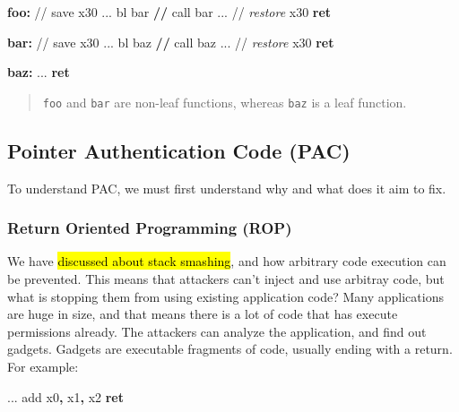 \documentclass[a4paper, nobind]{templates/ociamthesis}
\newenvironment{Shaded}{\begin{snugshade}}{\end{snugshade}}
\newcommand{\BuiltInTok}[1]{#1}
\newcommand{\ControlFlowTok}[1]{\textcolor[rgb]{0.13,0.29,0.53}{\textbf{#1}}}
\newcommand{\FunctionTok}[1]{\textcolor[rgb]{0.13,0.29,0.53}{\textbf{#1}}}
\newcommand{\NormalTok}[1]{#1}
\newcommand{\OperatorTok}[1]{\textcolor[rgb]{0.81,0.36,0.00}{\textbf{#1}}}
\newcommand{\PreprocessorTok}[1]{\textcolor[rgb]{0.56,0.35,0.01}{\textit{#1}}}
\renewenvironment{Shaded}
{
  \vspace{10pt}%
  \begin{snugshade}%
}{%
  \end{snugshade}%
  \vspace{8pt}%
}
\begin{document}
\begin{Shaded}
\begin{Highlighting}[]
\FunctionTok{foo:}
\NormalTok{  // save x30}
\NormalTok{  ...}
\NormalTok{  bl bar  }\OperatorTok{//}\NormalTok{ call bar}
\NormalTok{  ...}
\NormalTok{  // }\PreprocessorTok{restore}\NormalTok{ x30}
  \ControlFlowTok{ret}

\FunctionTok{bar:}
\NormalTok{  // save x30}
\NormalTok{  ...}
\NormalTok{  bl baz  }\OperatorTok{//}\NormalTok{ call baz}
\NormalTok{  ...}
\NormalTok{  // }\PreprocessorTok{restore}\NormalTok{ x30}
  \ControlFlowTok{ret}

\FunctionTok{baz:}
\NormalTok{  ...}
  \ControlFlowTok{ret}
\end{Highlighting}
\end{Shaded}

\begin{quote}
\texttt{foo} and \texttt{bar} are non-leaf functions, whereas \texttt{baz} is a leaf function.
\end{quote}

\subsection{Pointer Authentication Code (PAC)}\label{pointer-authentication-code-pac}

To understand PAC, we must first understand why and what does it aim to fix.

\subsubsection{Return Oriented Programming (ROP)}\label{return-oriented-programming-rop}

We have \hl{discussed about stack smashing}, and how arbitrary code execution can be prevented.
This means that attackers can't inject and use arbitray code, but what is stopping
them from using existing application code? Many applications are huge in size,
and that means there is a lot of code that has execute permissions already.
The attackers can analyze the application, and find out gadgets. Gadgets are executable
fragments of code, usually ending with a return. For example:

\begin{Shaded}
\begin{Highlighting}[]
\NormalTok{...}
\BuiltInTok{add}\NormalTok{ x0}\OperatorTok{,}\NormalTok{ x1}\OperatorTok{,}\NormalTok{ x2}
\ControlFlowTok{ret}
\end{Highlighting}
\end{Shaded}
\end{document}
